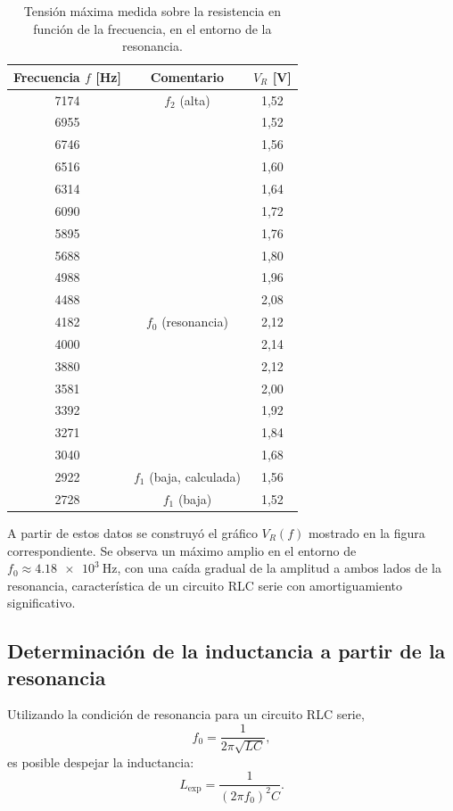 \documentclass[a4paper,12pt]{article}
\begin{document}
\begin{table}[h]
    \centering
    \begin{tabular}{ccc}
        \toprule
        Frecuencia \( f \) [Hz] & Comentario & \( V_R \) [V] \\
        \midrule
        7174 & \( f_2 \) (alta) & 1{,}52 \\
        6955 & & 1{,}52 \\
        6746 & & 1{,}56 \\
        6516 & & 1{,}60 \\
        6314 & & 1{,}64 \\
        6090 & & 1{,}72 \\
        5895 & & 1{,}76 \\
        5688 & & 1{,}80 \\
        4988 & & 1{,}96 \\
        4488 & & 2{,}08 \\
        4182 & \( f_0 \) (resonancia) & 2{,}12 \\
        4000 & & 2{,}14 \\
        3880 & & 2{,}12 \\
        3581 & & 2{,}00 \\
        3392 & & 1{,}92 \\
        3271 & & 1{,}84 \\
        3040 & & 1{,}68 \\
        2922 & \( f_1 \) (baja, calculada) & 1{,}56 \\
        2728 & \( f_1 \) (baja) & 1{,}52 \\
        \bottomrule
    \end{tabular}
    \caption{Tensión máxima medida sobre la resistencia en función de la frecuencia, en el entorno de la resonancia.}
\end{table}

A partir de estos datos se construyó el gráfico \( V_R(f) \) mostrado en la figura correspondiente. Se observa un máximo amplio en el entorno de \( f_0 \approx \SI{4.18e3}{\hertz} \), con una caída gradual de la amplitud a ambos lados de la resonancia, característica de un circuito RLC serie con amortiguamiento significativo.

\subsection{Determinación de la inductancia a partir de la resonancia}
Utilizando la condición de resonancia para un circuito RLC serie,
\[
f_0 = \frac{1}{2\pi\sqrt{LC}},
\]
es posible despejar la inductancia:
\[
L_{\text{exp}} = \frac{1}{(2\pi f_0)^2 C}.
\]
\end{document}
